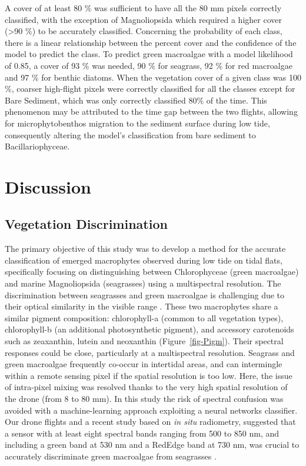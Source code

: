 \documentclass[
  number]{elsarticle}
\begin{document}
A cover of at least 80 \% was sufficient to have all the 80 mm pixels
correctly classified, with the exception of Magnoliopsida which required
a higher cover (\textgreater90 \%) to be accurately classified.
Concerning the probability of each class, there is a linear relationship
between the percent cover and the confidence of the model to predict the
class. To predict green macroalgae with a model likelihood of 0.85, a
cover of 93 \% was needed, 90 \% for seagrass, 92 \% for red macroalgae
and 97 \% for benthic diatoms. When the vegetation cover of a given
class was 100 \%, coarser high-flight pixels were correctly classified
for all the classes except for Bare Sediment, which was only correctly
classified 80\% of the time. This phenomenon may be attributed to the
time gap between the two flights, allowing for microphytobenthos
migration to the sediment surface during low tide, consequently altering
the model's classification from bare sediment to Bacillariophyceae.

\section{Discussion}\label{discussion}

\subsection{Vegetation Discrimination}\label{vegetation-discrimination}

The primary objective of this study was to develop a method for the
accurate classification of emerged macrophytes observed during low tide
on tidal flats, specifically focusing on distinguishing between
Chlorophyceae (green macroalgae) and marine Magnoliopsida (seagrasses)
using a multispectral resolution. The discrimination between seagrasses
and green macroalgae is challenging due to their optical similarity in
the visible range
\citep{oiry2021using, bannari2022, veettil2020opportunities}. These two
macrophytes share a similar pigment composition: chlorophyll-a (common
to all vegetation types), chlorophyll-b (an additional photosynthetic
pigment), and accessory carotenoids such as zeaxanthin, lutein and
neoxanthin (Figure~\ref{fig-Pigm}). Their spectral responses could be
close, particularly at a multispectral resolution. Seagrass and green
macroalgae frequently co-occur in intertidal areas, and can intermingle
within a remote sensing pixel if the spatial resolution is too low.
Here, the issue of intra-pixel mixing was resolved thanks to the very
high spatial resolution of the drone (from 8 to 80 mm). In this study
the risk of spectral confusion was avoided with a machine-learning
approach exploiting a neural networks classifier. Our drone flights and
a recent study based on \emph{in situ} radiometry, suggested that a
sensor with at least eight spectral bands ranging from 500 to 850 nm,
and including a green band at 530 nm and a RedEdge band at 730 nm, was
crucial to accurately discriminate green macroalgae from seagrasses
\citep{Davies2023}.
\end{document}
